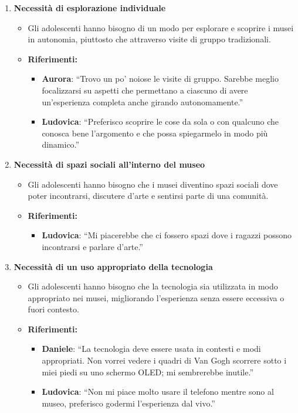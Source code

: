 \documentclass{article}
\begin{document}
\begin{enumerate}
    \item \textbf{Necessità di esplorazione individuale}
    \begin{itemize}
        \item Gli adolescenti hanno bisogno di un modo per esplorare e scoprire i musei in autonomia, piuttosto che attraverso visite di gruppo tradizionali.
        \item \textbf{Riferimenti:}
        \begin{itemize}
            \item \textbf{Aurora}: ``Trovo un po' noiose le visite di gruppo. Sarebbe meglio focalizzarsi su aspetti che permettano a ciascuno di avere un'esperienza completa anche girando autonomamente.''
            \item \textbf{Ludovica}: ``Preferisco scoprire le cose da sola o con qualcuno che conosca bene l'argomento e che possa spiegarmelo in modo più dinamico.''
        \end{itemize}
    \end{itemize}

    \item \textbf{Necessità di spazi sociali all'interno del museo}
    \begin{itemize}
        \item Gli adolescenti hanno bisogno che i musei diventino spazi sociali dove poter incontrarsi, discutere d'arte e sentirsi parte di una comunità.
        \item \textbf{Riferimenti:}
        \begin{itemize}
            \item \textbf{Ludovica}: ``Mi piacerebbe che ci fossero spazi dove i ragazzi possono incontrarsi e parlare d'arte.''
        \end{itemize}
    \end{itemize}

    \item \textbf{Necessità di un uso appropriato della tecnologia}
    \begin{itemize}
        \item Gli adolescenti hanno bisogno che la tecnologia sia utilizzata in modo appropriato nei musei, migliorando l'esperienza senza essere eccessiva o fuori contesto.
        \item \textbf{Riferimenti:}
        \begin{itemize}
            \item \textbf{Daniele}: ``La tecnologia deve essere usata in contesti e modi appropriati. Non vorrei vedere i quadri di Van Gogh scorrere sotto i miei piedi su uno schermo OLED; mi sembrerebbe inutile.''
            \item \textbf{Ludovica}: ``Non mi piace molto usare il telefono mentre sono al museo, preferisco godermi l'esperienza dal vivo.''
        \end{itemize}
    \end{itemize}


\end{enumerate}
\end{document}
